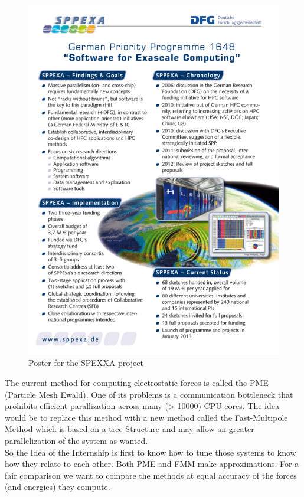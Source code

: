 \documentclass[12pt,twoside,a4paper]{report}
\begin{document}
\begin{figure}[H]
\includegraphics[scale=2]{sppexa-poster}
 \centering 
\caption{Poster for the SPEXXA project}
\label{fig:poster}
\end{figure}


The current method for computing electrostatic forces is called the PME (Particle Mesh Ewald). One of its problems is a communication bottleneck that prohibits efficient parallization across many (> 10000) CPU cores. The idea would be to replace this method with a new method called the Fast-Multipole Method which is based on a tree Structure and may allow an greater parallelization of the system as wanted.\\

So the Idea of the Internship is first to know how to tune those systems to know how they relate to each other. Both PME and FMM make approximations. For a fair comparison we want to compare the methods at equal accuracy of the forces (and energies) they compute. 
\end{document}
